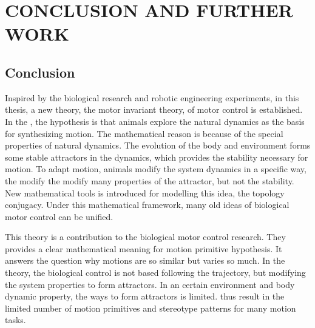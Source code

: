 \def\baselinestretch{1}
\chapter{CONCLUSION AND FURTHER WORK}
\label{chap:con}
\graphicspath{{Conclusions/ConclusionsFigs/EPS/}{Conclusions/ConclusionsFigs/}}


\def\baselinestretch{1.66}

\section{Conclusion}

Inspired by the biological research and robotic engineering experiments, in this thesis, a new theory, the motor invariant theory, of motor control is established.
In the \moit, the hypothesis is that animals explore the natural dynamics as the basis for synthesizing motion.
The mathematical reason is because of the special properties of natural dynamics.
The evolution of the body and environment forms some stable attractors in the dynamics, which provides the stability necessary for motion.
To adapt motion, animals modify the system dynamics in a specific way, the modify the modify many properties of the attractor, but not the stability.
New mathematical tools is introduced for modelling this idea, the topology conjugacy.
Under this mathematical framework, many old ideas of biological motor control can be unified.


This theory is a contribution to the biological motor control research.
They provides a clear mathematical meaning for  motion primitive hypothesis.
It answers the question why motions are so similar but varies so much.
In the \moit theory, the biological control is not based following the trajectory,
but modifying the system properties to form attractors.
In an certain environment and body dynamic property,
the ways to form attractors is limited.
thus result in the limited number of motion primitives and stereotype patterns for many motion tasks.



